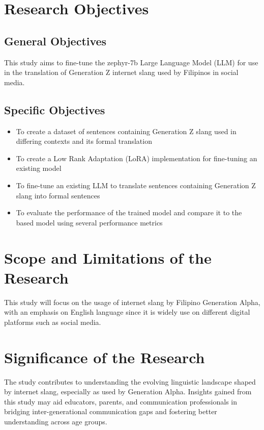 \section{Research Objectives}
\label{sec:research_objectives}

\subsection{General Objectives}
\label{sec:general_objectives}
This study aims to fine-tune the zephyr-7b Large Language Model (LLM) for use in the translation of Generation Z internet slang used by Filipinos in social media.
\subsection{Specific Objectives}
\label{sec:specific_objectives}
\begin{itemize}
	\item To create a dataset of sentences containing Generation Z slang used in differing contexts and its formal translation
	\item To create a Low Rank Adaptation (LoRA) implementation for fine-tuning an existing model
	\item To fine-tune an existing LLM to translate sentences containing Generation Z slang into formal sentences
	\item To evaluate the performance of the trained model and compare it to the based model using several performance metrics
\end{itemize}

\section{Scope and Limitations of the Research}
\label{sec:scope}
This study will focus on the usage of internet slang by Filipino Generation Alpha, with an emphasis on English language since it is widely use on different digital platforms such as social media.

\section{Significance of the Research}
\label{sec:significance}
The study contributes to understanding the evolving linguistic landscape shaped by internet slang, especially as used by Generation Alpha.
Insights gained from this study may aid educators, parents, and communication professionals in bridging inter-generational communication gaps and fostering better understanding across age groups.
